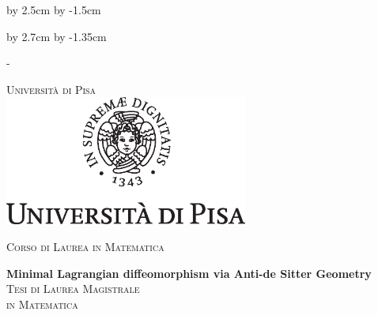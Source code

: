   \advance\vsize by 2.5cm %
\advance\voffset by -1.5cm %


\begin{titlingpage}


\advance\hsize by 2.7cm %
\advance\hoffset by -1.35cm %




\calccentering{\unitlength}
\begin{adjustwidth*}{\unitlength}{-\unitlength}


\thispagestyle{empty}
\begin{center}
\large
\textsc{\Large Università di Pisa\\}
\vspace{0.6cm}
\includegraphics[width=8cm]{cherubino.eps}

\vspace{0.8cm}
\textsc{\Large{Corso di Laurea in Matematica}}\\



\vspace{2.5cm}


{\LARGE\textbf{Minimal Lagrangian diffeomorphism via Anti-de Sitter Geometry}}
\\[2.0cm]

\textsc{Tesi di Laurea Magistrale \\[0.2cm] in Matematica}\\
\vspace{0.5cm}



\vspace{0.2cm}

%
%


\end{center}
\end{adjustwidth*}
\end{titlingpage}
